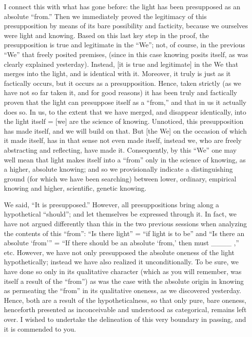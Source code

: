 I connect this with what has gone before:
the light has been presupposed as an absolute “from.”
Then we immediately proved the legitimacy of
this presupposition by means of
its bare possibility and facticity,
because we ourselves were light and knowing.
Based on this last key step in the proof,
the presupposition is true and legitimate in the “We”;
not, of course, in the previous “We” that freely posited premises,
(since in this case knowing posits itself,
as was clearly explained yesterday).
Instead, [it is true and legitimate] in the We
that merges into the light,
and is identical with it.
Moreover, it truly is just as it factically occurs,
but it occurs as a presupposition.
Hence, taken strictly
(as we have not so far taken it, and for good reasons)
it has been truly and factically proven that
the light can presuppose itself as a “from,”
and that in us it actually does so.
In us, to the extent that we have merged,
and disappear identically, into the light itself =
[we] are the science of knowing.
Unnoticed, this presupposition has made itself,
and we will build on that.
But [the We] on the occasion of which it made itself,
has in that sense not even made itself,
instead we, who are freely abstracting and reflecting, have made it.
Consequently, by this “We” one may well mean that
light makes itself into a “from” only
in the science of knowing, as a higher, absolute knowing;
and so we provisionally indicate a distinguishing ground
(for which we have been searching)
between lower, ordinary, empirical knowing
and higher, scientific, genetic knowing.

We said, “It is presupposed.”
However, all presuppositions
bring along a hypothetical “should”;
and let themselves be expressed through it.
In fact, we have not argued differently than this
in the two previous sessions
when analyzing the contents of this “from”:
“Is there light” = “if light is to be”
and “Is there an absolute ‘from'” =
“If there should be an absolute ‘from,'
then must ____ ,” etc.
However, we have not only presupposed
the absolute oneness of the light hypothetically;
instead we have also realized it unconditionally.
To be sure, we have done so only in its qualitative character
(which as you will remember, was itself a result of the “from”)
as was the case with the absolute origin in knowing
as permeating the “from” in its qualitative oneness,
as we discovered yesterday.
Hence, both are a result of the hypotheticalness,
so that only pure, bare oneness,
henceforth presented as inconceivable
and understood as categorical,
remains left over.
I wished to undertake the delineation of
this very boundary in passing,
and it is commended to you.


